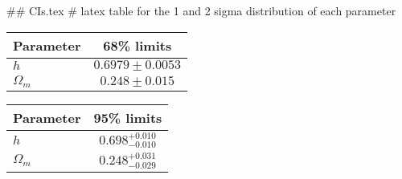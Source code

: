 ## CIs.tex
# latex table for the 1 and 2 sigma distribution of each parameter

\begin{tabular} { l  c}
 Parameter &  68\% limits\\
\hline
{\boldmath$h              $} & $0.6979\pm 0.0053          $\\
{\boldmath$\Omega_m       $} & $0.248\pm 0.015            $\\
\hline
\end{tabular}

\begin{tabular} { l  c}
 Parameter &  95\% limits\\
\hline
{\boldmath$h              $} & $0.698^{+0.010}_{-0.010}   $\\
{\boldmath$\Omega_m       $} & $0.248^{+0.031}_{-0.029}   $\\
\hline
\end{tabular}
